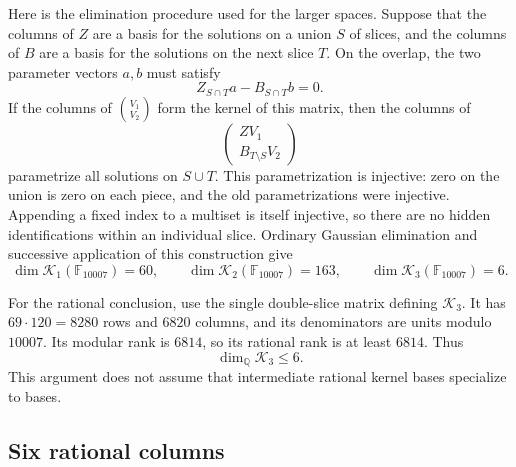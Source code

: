 Here is the elimination procedure used for the larger spaces.
Suppose that the columns of $Z$ are a basis for the solutions on a union
$S$ of slices, and the columns of $B$ are a basis for the solutions on the
next slice $T$. On the overlap, the two parameter vectors $a,b$
must satisfy
\[
 Z_{S\cap T}a-B_{S\cap T}b=0.
\]
If the columns of $\binom{V_1}{V_2}$ form the kernel of this matrix,
then the columns of
\[
 \begin{pmatrix} ZV_1\\ B_{T\setminus S}V_2\end{pmatrix}
\]
parametrize all solutions on $S\cup T$. This parametrization is
injective: zero on the union is zero on each piece, and the old
parametrizations were injective. Appending a fixed index to a
multiset is itself injective, so there are no hidden identifications
within an individual slice. Ordinary Gaussian elimination and
successive application of this construction give
\begin{equation}\label{eq:finite-field-dimensions}
 \dim\mathcal K_1(\mathbb F_{10007})=60,
 \qquad\dim\mathcal K_2(\mathbb F_{10007})=163,
 \qquad\dim\mathcal K_3(\mathbb F_{10007})=6.
\end{equation}

For the rational conclusion, use the single double-slice matrix
defining $\mathcal K_3$. It has $69\cdot120=8280$ rows and $6820$
columns, and its denominators are units modulo $10007$. Its modular
rank is $6814$, so its rational rank is at least $6814$. Thus
\begin{equation}\label{eq:rational-dimension-upper}
 \dim_{\mathbb Q}\mathcal K_3\le6.
\end{equation}
This argument does not assume that intermediate rational kernel
bases specialize to bases.

\subsection{Six rational columns}

